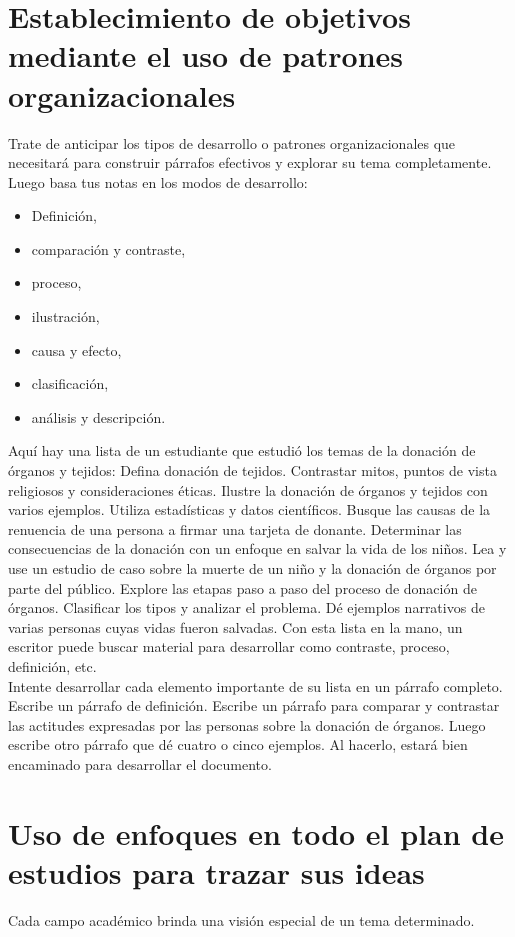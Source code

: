 \section{Establecimiento de objetivos mediante el uso de patrones organizacionales}
Trate de anticipar los tipos de desarrollo o patrones organizacionales que necesitará para construir párrafos efectivos y explorar su tema completamente. Luego basa tus notas en los modos de desarrollo:
\begin{itemize}
    \item Definición, 
    \item comparación y contraste, 
    \item proceso, 
    \item ilustración, 
    \item causa y efecto, 
    \item clasificación, 
    \item análisis y descripción. 
\end{itemize}
Aquí hay una lista de un estudiante que estudió los temas de la donación de órganos y tejidos: Defina donación de tejidos. Contrastar mitos, puntos de vista religiosos y consideraciones éticas. Ilustre la donación de órganos y tejidos con varios ejemplos. Utiliza estadísticas y datos científicos. Busque las causas de la renuencia de una persona a firmar una tarjeta de donante. Determinar las consecuencias de la donación con un enfoque en salvar la vida de los niños. Lea y use un estudio de caso sobre la muerte de un niño y la donación de órganos por parte del público. Explore las etapas paso a paso del proceso de donación de órganos. Clasificar los tipos y analizar el problema. Dé ejemplos narrativos de varias personas cuyas vidas fueron salvadas. Con esta lista en la mano, un escritor puede buscar material para desarrollar como contraste, proceso, definición, etc.\\

Intente desarrollar cada elemento importante de su lista en un párrafo completo. Escribe un párrafo de definición. Escribe un párrafo para comparar y contrastar las actitudes expresadas por las personas sobre la donación de órganos. Luego escribe otro párrafo que dé cuatro o cinco ejemplos. Al hacerlo, estará bien encaminado para desarrollar el documento.\\

\section{Uso de enfoques en todo el plan de estudios para trazar sus ideas}
Cada campo académico brinda una visión especial de un tema determinado.

